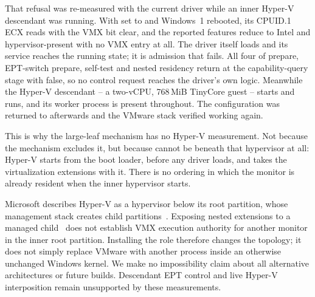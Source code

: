 That refusal was re-measured with the current driver while an inner Hyper-V
descendant was running. With  set to  and
Windows~1 rebooted, its CPUID.1 ECX reads  with the VMX bit
clear, and the reported features reduce to Intel and hypervisor-present with no
VMX entry at all. The driver itself loads and its service reaches the running
state; it is admission that fails. All four of prepare, EPT-switch prepare,
self-test and nested residency return  at the
capability-query stage with  false, so no control request
reaches the driver's own logic. Meanwhile the Hyper-V descendant -- a two-vCPU,
768\,MiB TinyCore guest -- starts and runs, and its worker process is present
throughout. The configuration was returned to  afterwards and the
VMware stack verified working again.

This is why the large-leaf mechanism has no Hyper-V measurement. Not because the
mechanism excludes it, but because \ks{} cannot be beneath that hypervisor at
all: Hyper-V starts from the boot loader, before any driver loads, and takes the
virtualization extensions with it. There is no ordering in which the monitor is
already resident when the inner hypervisor starts.

Microsoft describes Hyper-V as a hypervisor below its root partition, whose
management stack creates child partitions~\cite{hyperv-architecture}. Exposing
nested extensions to a managed child~\cite{hyperv-nested} does not establish
VMX execution authority for another monitor in the inner root partition.
Installing the role therefore changes the topology; it does not simply replace
VMware with another process inside an otherwise unchanged Windows kernel.
We make no impossibility claim about all alternative architectures or future
builds. Descendant EPT control and live Hyper-V interposition remain unsupported
by these measurements.
